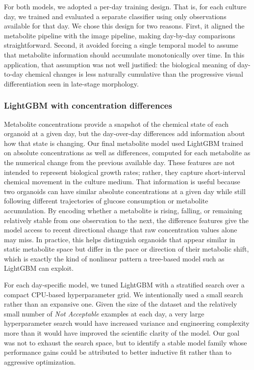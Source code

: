 \documentclass{article}
\begin{document}
For both models, we adopted a per-day training design. That is, for each culture day, we trained and evaluated a separate classifier using only observations available for that day. We chose this design for two reasons. First, it aligned the metabolite pipeline with the image pipeline, making day-by-day comparisons straightforward. Second, it avoided forcing a single temporal model to assume that metabolite information should accumulate monotonically over time. In this application, that assumption was not well justified: the biological meaning of day-to-day chemical changes is less naturally cumulative than the progressive visual differentiation seen in late-stage morphology.

\subsubsection{LightGBM with concentration differences}

Metabolite concentrations provide a snapshot of the chemical state of each organoid at a given day, but the day-over-day differences add information about how that state is changing. Our final metabolite model  used LightGBM trained on absolute concentrations as well as differences, computed for each metabolite as the numerical change from the previous available day. These features are not intended to represent biological growth rates; rather, they capture short-interval chemical movement in the culture medium. That information is useful because two organoids can have similar absolute concentrations at a given day while still following different trajectories of glucose consumption or metabolite accumulation. By encoding whether a metabolite is rising, falling, or remaining relatively stable from one observation to the next, the difference features give the model access to recent directional change that raw concentration values alone may miss. In practice, this helps distinguish organoids that appear similar in static metabolite space but differ in the pace or direction of their metabolic shift, which is exactly the kind of nonlinear pattern a tree-based model such as LightGBM can exploit.

For each day-specific model, we tuned LightGBM with a stratified search over a compact CPU-based hyperparameter grid. We intentionally used a small search rather than an expansive one. Given the size of the dataset and the relatively small number of \textit{Not Acceptable} examples at each day, a very large hyperparameter search would have increased variance and engineering complexity more than it would have improved the scientific clarity of the model. Our goal was not to exhaust the search space, but to identify a stable model family whose performance gains could be attributed to better inductive fit rather than to aggressive optimization.
\end{document}
